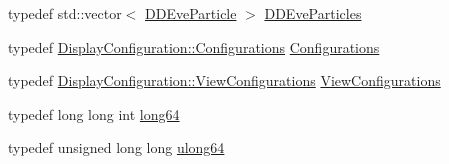 \begin{DoxyCompactItemize}
\item 
typedef std::vector$<$ \hyperlink{class_d_d4hep_1_1_d_d_eve_particle}{DDEveParticle} $>$ \hyperlink{namespace_d_d4hep_a85a43876137cdbe2bd77272afb14586b}{DDEveParticles}
\item 
typedef \hyperlink{class_d_d4hep_1_1_display_configuration_ac43586ae2c70f106cc9027d452d383d7}{DisplayConfiguration::Configurations} \hyperlink{namespace_d_d4hep_a88b4bb8cba5bc194ed6da21bbb2e4787}{Configurations}
\item 
typedef \hyperlink{class_d_d4hep_1_1_display_configuration_a38d6c82b57ac859a5d5cf67fe26f4920}{DisplayConfiguration::ViewConfigurations} \hyperlink{namespace_d_d4hep_a9c889ac82251df068ece7fbba1c2d1c0}{ViewConfigurations}
\item 
typedef long long int \hyperlink{namespace_d_d4hep_ac2a70e722b33dc7ddaa20db8954ac836}{long64}
\item 
typedef unsigned long long \hyperlink{namespace_d_d4hep_a7a8348d075fd0a3bafc06de7cde7a750}{ulong64}
\end{DoxyCompactItemize}
